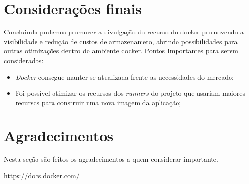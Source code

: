 \documentclass{modelo_banner}
\begin{document}
\begin{multicols}{2}
		\section{Considerações finais}
			 Concluindo podemos promover a divulgação do recurso do docker promovendo a visibilidade e redução de custos de armazenameto, abrindo possibilidades para outras otimizações dentro do ambiente docker.
		Pontos Importantes para serem considerados:
		
		\begin{itemize}
			\item \textit{Docker} consegue manter-se atualizada frente as necessidades do mercado;
			
			\item Foi possível otimizar os recursos dos \textit{runners} do projeto que usariam maiores recursos para construir uma nova imagem da aplicação;
		\end{itemize}		
		\section{Agradecimentos}
		
		Nesta seção são feitos os agradecimentos a quem considerar importante.
		
		https://docs.docker.com/
	\end{multicols}
	
	\rodape
\end{document}
